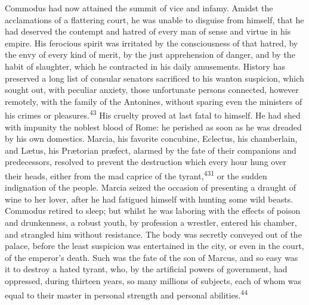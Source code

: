 





Commodus had now attained the summit of vice and infamy. Amidst
the acclamations of a flattering court, he was unable to disguise
from himself, that he had deserved the contempt and hatred of
every man of sense and virtue in his empire. His ferocious spirit
was irritated by the consciousness of that hatred, by the envy of
every kind of merit, by the just apprehension of danger, and by
the habit of slaughter, which he contracted in his daily
amusements. History has preserved a long list of consular
senators sacrificed to his wanton suspicion, which sought out,
with peculiar anxiety, those unfortunate persons connected,
however remotely, with the family of the Antonines, without
sparing even the ministers of his crimes or pleasures.\textsuperscript{43} His
cruelty proved at last fatal to himself. He had shed with
impunity the noblest blood of Rome: he perished as soon as he was
dreaded by his own domestics. Marcia, his favorite concubine,
Eclectus, his chamberlain, and Lætus, his Prætorian præfect,
alarmed by the fate of their companions and predecessors,
resolved to prevent the destruction which every hour hung over
their heads, either from the mad caprice of the tyrant,\textsuperscript{431} or
the sudden indignation of the people. Marcia seized the occasion
of presenting a draught of wine to her lover, after he had
fatigued himself with hunting some wild beasts. Commodus retired
to sleep; but whilst he was laboring with the effects of poison
and drunkenness, a robust youth, by profession a wrestler,
entered his chamber, and strangled him without resistance. The
body was secretly conveyed out of the palace, before the least
suspicion was entertained in the city, or even in the court, of
the emperor’s death. Such was the fate of the son of Marcus, and
so easy was it to destroy a hated tyrant, who, by the artificial
powers of government, had oppressed, during thirteen years, so
many millions of subjects, each of whom was equal to their master
in personal strength and personal abilities.\textsuperscript{44}

